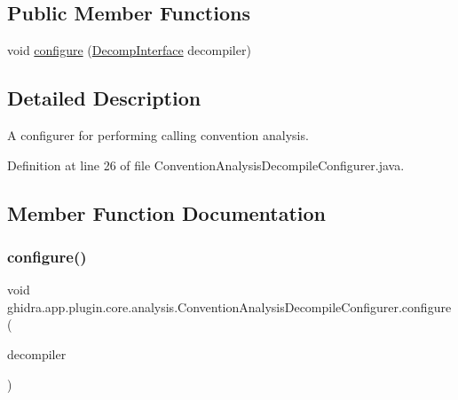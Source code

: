 \subsection*{Public Member Functions}
\begin{DoxyCompactItemize}
\item 
void \mbox{\hyperlink{classghidra_1_1app_1_1plugin_1_1core_1_1analysis_1_1_convention_analysis_decompile_configurer_adc88f5c9f1553203058c35fdcda69cfb}{configure}} (\mbox{\hyperlink{classghidra_1_1app_1_1decompiler_1_1_decomp_interface}{Decomp\+Interface}} decompiler)
\end{DoxyCompactItemize}


\subsection{Detailed Description}
A configurer for performing calling convention analysis. 

Definition at line 26 of file Convention\+Analysis\+Decompile\+Configurer.\+java.



\subsection{Member Function Documentation}
\mbox{\label{classghidra_1_1app_1_1plugin_1_1core_1_1analysis_1_1_convention_analysis_decompile_configurer_adc88f5c9f1553203058c35fdcda69cfb}} 
\subsubsection{\texorpdfstring{configure()}{configure()}}
{\footnotesize\ttfamily void ghidra.\+app.\+plugin.\+core.\+analysis.\+Convention\+Analysis\+Decompile\+Configurer.\+configure (\begin{DoxyParamCaption}\item[{\mbox{\hyperlink{classghidra_1_1app_1_1decompiler_1_1_decomp_interface}{Decomp\+Interface}}}]{decompiler }\end{DoxyParamCaption})\hspace{0.3cm}{\ttfamily [inline]}}

